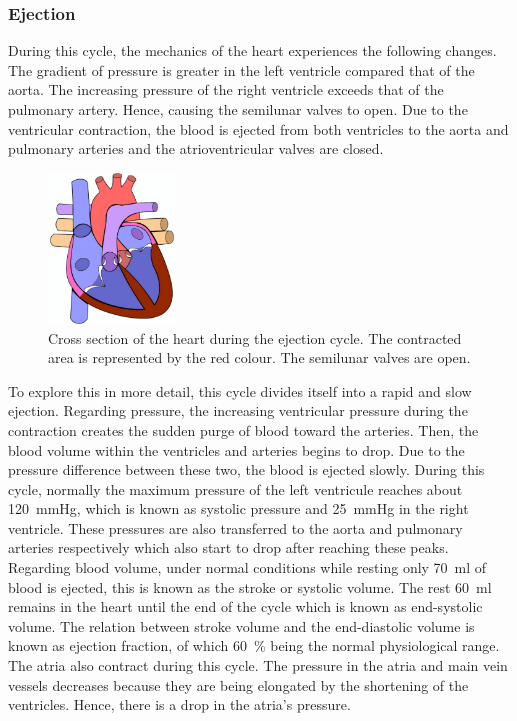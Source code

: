 

\subsubsection{Ejection}
During this cycle, the mechanics of the heart experiences the following changes. The gradient of pressure is greater in the left ventricle compared that of the aorta. The increasing pressure of the right ventricle exceeds that of the pulmonary artery. Hence, causing the semilunar valves to open. Due to the ventricular contraction, the blood is ejected from both ventricles to the aorta and pulmonary arteries and the atrioventricular valves are closed.

\begin{figure}[!htpb]
	\centering
	\includegraphics[height=4cm,keepaspectratio]{figure_6}
	\caption[Cross section of the heart during the ejection cycle]{Cross section of the heart during the ejection cycle. The contracted area is represented by the red colour. The semilunar valves are open.}
	\label{fig:heart ejection}
\end{figure}

To explore this in more detail, this cycle divides itself into a rapid and slow ejection. Regarding pressure, the increasing ventricular pressure during the contraction creates the sudden purge of blood toward the arteries. Then, the blood volume within the ventricles and arteries begins to drop. Due to the pressure difference between these two, the blood is ejected slowly. During this cycle, normally the maximum pressure of the left ventricule reaches about \SI{120}{\mmHg}, which is known as systolic pressure and \SI{25}{\mmHg} in the right ventricle. These pressures are also transferred to the aorta and pulmonary arteries respectively which also start to drop after reaching these peaks. Regarding blood volume, under normal conditions while resting only \SI{70}{\milli\litre} of blood is ejected, this is known as the stroke or systolic volume. The rest \SI{60}{\milli\litre} remains in the heart until the end of the cycle which is known as end-systolic volume. The relation between stroke volume and the end-diastolic volume is known as ejection fraction, of which \SI{60}{\percent} being the normal physiological range. The atria also contract during this cycle. The pressure in the atria and main vein vessels decreases because they are being elongated by the shortening of the ventricles. Hence, there is a drop in the atria's pressure. 

